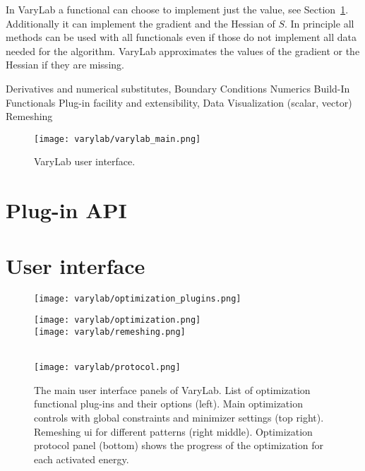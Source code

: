 \documentclass[Thesis.tex]{subfiles}
\begin{document}
In {\sc VaryLab} a functional can choose to implement just the value, see Section~\ref{sec:plugin-api}. Additionally it can implement the gradient and the Hessian of $S$. In principle all methods can be used with all functionals even if those do not implement all data needed for the algorithm. {\sc VaryLab} approximates the values of the gradient or the Hessian if they are missing. 

Derivatives and numerical substitutes, 
Boundary Conditions
Numerics
Build-In Functionals
Plug-in facility and extensibility, 
Data Visualization (scalar, vector)
Remeshing

\begin{figure}
\begin{center}
\texttt{[image: varylab/varylab\_main.png]}
\caption{{\sc VaryLab} user interface.}
\label{fig:varylab_main_ui}
\end{center}
\end{figure}

\section{Plug-in API}
\label{sec:plugin-api}

\section{User interface}



\begin{figure}
\begin{center}
\texttt{[image: varylab/optimization\_plugins.png]}\hfill
\begin{minipage}[b]{0.47\linewidth}
\texttt{[image: varylab/optimization.png]}\\
\texttt{[image: varylab/remeshing.png]}
\end{minipage}\\
\vskip 0.05cm
\texttt{[image: varylab/protocol.png]}
\caption{The main user interface panels of {\sc VaryLab}. List of optimization functional plug-ins and their options (left). Main optimization controls with global constraints and minimizer settings (top right). Remeshing ui for different patterns (right middle). Optimization protocol panel (bottom) shows the progress of the optimization for each activated energy.}
\label{default}
\end{center}
\end{figure}
\end{document}
